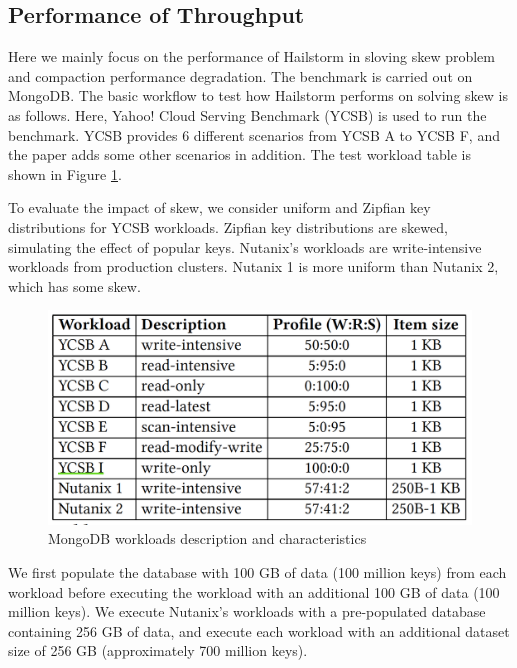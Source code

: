 \documentclass[a4paper,10pt,twoside]{article}
\begin{document}
\subsection{Performance of Throughput}
Here we mainly focus on the performance of Hailstorm in sloving skew problem and compaction performance degradation.
The benchmark is carried out on MongoDB.
The basic workflow to test how Hailstorm performs on solving skew is as follows.
Here, Yahoo! Cloud Serving Benchmark (YCSB)\cite{10.1007/978-3-319-10085-2_18} is used to run the benchmark.
YCSB provides 6 different scenarios from YCSB A to YCSB F, and the paper adds some other scenarios in addition.
The test workload table is shown in Figure \ref{fig:mesh6}.
\par
To evaluate the impact of skew, we consider uniform and Zipfian key distributions for YCSB workloads.
Zipfian key distributions are skewed, simulating the effect of popular keys. 
Nutanix’s workloads are write-intensive workloads from production clusters. 
Nutanix 1 is more uniform than Nutanix 2, which has some skew.
\begin{figure}[h]
    \centering
	\includegraphics[scale=0.3]{YCSB_workload.png}
    \caption{MongoDB workloads description and characteristics \cite{mainpaper}}
    \label{fig:mesh6}
\end{figure}
\newline
We first populate the database with 100 GB of data (100 million keys) from each workload before executing the workload with an additional 100 GB of data (100 million keys).
We execute Nutanix’s workloads with a pre-populated database containing 256 GB of data, and execute each workload with an additional dataset size of 256 GB (approximately 700 million keys).
\end{document}
